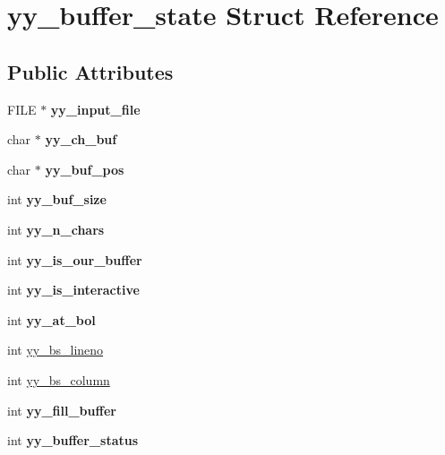 \hypertarget{structyy__buffer__state}{}\section{yy\+\_\+buffer\+\_\+state Struct Reference}
\label{structyy__buffer__state}
\subsection*{Public Attributes}
\begin{DoxyCompactItemize}
\item 
\mbox{\label{structyy__buffer__state_a4843d1422e3276b636d475a3095bd948}} 
F\+I\+LE $\ast$ {\bfseries yy\+\_\+input\+\_\+file}
\item 
\mbox{\label{structyy__buffer__state_ad7b8df8d8a4688e57b0b8d3ca75adc85}} 
char $\ast$ {\bfseries yy\+\_\+ch\+\_\+buf}
\item 
\mbox{\label{structyy__buffer__state_a58aa927f098b99d99e75da80f9b681ef}} 
char $\ast$ {\bfseries yy\+\_\+buf\+\_\+pos}
\item 
\mbox{\label{structyy__buffer__state_a451d39697f006f3922c1f43cf79286b4}} 
int {\bfseries yy\+\_\+buf\+\_\+size}
\item 
\mbox{\label{structyy__buffer__state_a06406208824817acfec2183b79080945}} 
int {\bfseries yy\+\_\+n\+\_\+chars}
\item 
\mbox{\label{structyy__buffer__state_a80ce2431c70dc4f89ced487f18449465}} 
int {\bfseries yy\+\_\+is\+\_\+our\+\_\+buffer}
\item 
\mbox{\label{structyy__buffer__state_abf5c70eea75581b58c0ee7bd31b14490}} 
int {\bfseries yy\+\_\+is\+\_\+interactive}
\item 
\mbox{\label{structyy__buffer__state_a9d60c60af6e1a6f69de16871fd64f85f}} 
int {\bfseries yy\+\_\+at\+\_\+bol}
\item 
int \hyperlink{structyy__buffer__state_a818e94bc9c766e683c60df1e9fd01199}{yy\+\_\+bs\+\_\+lineno}
\item 
int \hyperlink{structyy__buffer__state_a10c4fcd8be759e6bf11e6d3e8cdb0307}{yy\+\_\+bs\+\_\+column}
\item 
\mbox{\label{structyy__buffer__state_a63d2afbb1d79a3fc63df9e12626f827d}} 
int {\bfseries yy\+\_\+fill\+\_\+buffer}
\item 
\mbox{\label{structyy__buffer__state_a70fd925d37a2f0454fbd0def675d106c}} 
int {\bfseries yy\+\_\+buffer\+\_\+status}
\end{DoxyCompactItemize}


